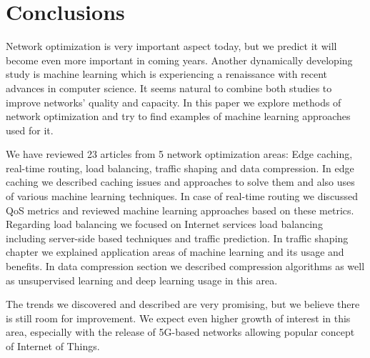 \documentclass[conference]{IEEEtran}
\begin{document}
\section{Conclusions}
Network optimization is very important aspect today, but we predict it will become even more important in coming years. Another dynamically developing study is machine learning which is experiencing a renaissance with recent advances in computer science. It seems natural to combine both studies to improve networks' quality and capacity. In this paper we explore methods of network optimization and try to find examples of machine learning approaches used for it. \par
We have reviewed 23 articles from 5 network optimization areas: Edge caching, real-time routing, load balancing, traffic shaping and data compression. In edge caching we described caching issues and approaches to solve them and also uses of various machine learning techniques. In case of real-time routing we discussed QoS metrics and reviewed machine learning approaches based on these metrics. Regarding load balancing we focused on Internet services load balancing including server-side based techniques and traffic prediction. In traffic shaping chapter we explained application areas of machine learning and its usage and benefits. In data compression section we described compression algorithms as well as unsupervised learning and deep learning usage in this area.\par
The trends we discovered and described are very promising, but we believe there is still room for improvement. We expect even higher growth of interest in this area, especially with the release of 5G-based networks allowing popular concept of Internet of Things. 






\end{document}
